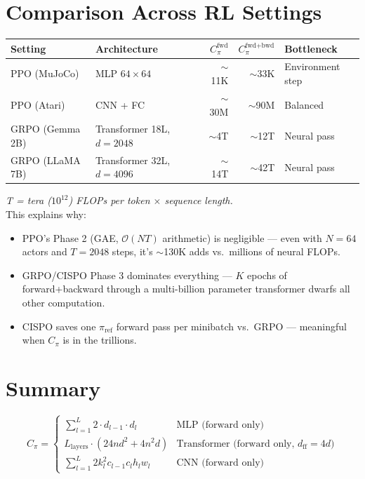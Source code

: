 \documentclass[11pt]{article}
\newcommand{\bigO}{\mathcal{O}}
\begin{document}
\section{Comparison Across RL Settings}

\begin{center}
\renewcommand{\arraystretch}{1.3}
\begin{tabular}{llrrl}
\toprule
\textbf{Setting} & \textbf{Architecture} & \textbf{$C_\pi^{\text{fwd}}$} & \textbf{$C_\pi^{\text{fwd+bwd}}$} & \textbf{Bottleneck} \\
\midrule
PPO (MuJoCo) & MLP $64{\times}64$ & $\sim$11K & $\sim$33K & Environment step \\
PPO (Atari) & CNN + FC & $\sim$30M & $\sim$90M & Balanced \\
GRPO (Gemma 2B) & Transformer 18L, $d\!=\!2048$ & $\sim$4T & $\sim$12T & Neural pass \\
GRPO (LLaMA 7B) & Transformer 32L, $d\!=\!4096$ & $\sim$14T & $\sim$42T & Neural pass \\
\bottomrule
\end{tabular}
\end{center}

\textit{T = tera ($10^{12}$) FLOPs per token $\times$ sequence length.}\\[6pt]
This explains why:
\begin{itemize}[nosep]
\item PPO's Phase 2 (GAE, $\bigO(NT)$ arithmetic) is negligible --- even with $N\!=\!64$ actors and $T\!=\!2048$ steps, it's $\sim$130K adds vs.\ millions of neural FLOPs.
\item GRPO/CISPO Phase 3 dominates everything --- $K$ epochs of forward+backward through a multi-billion parameter transformer dwarfs all other computation.
\item CISPO saves one $\pi_{\text{ref}}$ forward pass per minibatch vs.\ GRPO --- meaningful when $C_\pi$ is in the trillions.
\end{itemize}

\section{Summary}

\[
C_\pi = \begin{cases}
\displaystyle\sum_{l=1}^{L} 2 \cdot d_{l-1} \cdot d_l & \text{MLP (forward only)} \\[12pt]
L_{\text{layers}} \cdot (24nd^2 + 4n^2 d) & \text{Transformer (forward only, $d_{\text{ff}} = 4d$)} \\[12pt]
\displaystyle\sum_{l=1}^{L} 2 k_l^2 c_{l-1} c_l h_l w_l & \text{CNN (forward only)}
\end{cases}
\]
\end{document}
